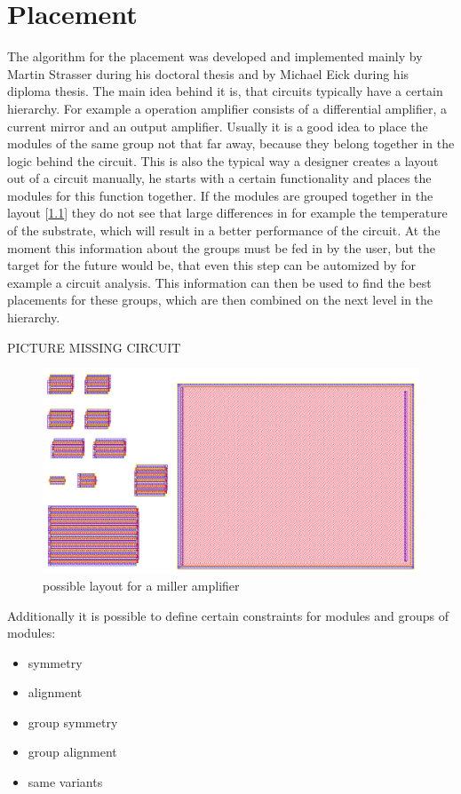 \chapter{Placement}
The algorithm for the placement was developed and implemented mainly by Martin Strasser during his doctoral thesis and by Michael Eick during his diploma thesis. The main idea behind it is, that circuits typically have a certain hierarchy. For example a operation amplifier consists of a differential amplifier, a current mirror and an output amplifier. Usually it is a good idea to place the modules of the same group not that far away, because they belong together in the logic behind the circuit. This is also the typical way a designer creates a layout out of a circuit manually, he starts with a certain functionality and places the modules for this function together. If the modules are grouped together in the layout [\ref{fig:miller_amplifier_layout}] they do not see that large differences in for example the temperature of the substrate, which will result in a better performance of the circuit.
At the moment this information about the groups must be fed in by the user, but the target for the future would be, that even this step can be automized by for example a circuit analysis. This information can then be used to find the best placements for these groups, which are then combined on the next level in the hierarchy.

PICTURE MISSING CIRCUIT

\begin{figure}
	\centering
	\includegraphics[scale=0.4]{FIG/miller_amplifier_layout.png}
	\caption{possible layout for a miller amplifier}
	\label{fig:miller_amplifier_layout}
\end{figure}

Additionally it is possible to define certain constraints for modules and groups of modules:
\begin{itemize}
\item symmetry
\item alignment
\item group symmetry
\item group alignment
\item same variants
\end{itemize}

